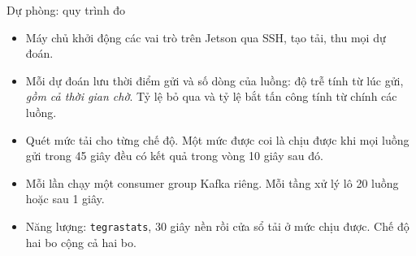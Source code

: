 \documentclass[aspectratio=169, 11pt]{beamer}
\begin{document}
\begin{frame}{Dự phòng: quy trình đo}
  \begin{itemize}\small
    \item Máy chủ khởi động các vai trò trên Jetson qua SSH, tạo tải, thu mọi
          dự đoán.
    \item Mỗi dự đoán lưu thời điểm gửi và số dòng của luồng: độ trễ tính từ
          lúc gửi, \emph{gồm cả thời gian chờ}. Tỷ lệ bỏ qua và tỷ lệ bắt tấn
          công tính từ chính các luồng.
    \item Quét mức tải cho từng chế độ. Một mức được coi là chịu được khi mọi
          luồng gửi trong 45 giây đều có kết quả trong vòng 10 giây sau đó.
    \item Mỗi lần chạy một consumer group Kafka riêng. Mỗi tầng xử lý lô 20
          luồng hoặc sau 1 giây.
    \item Năng lượng: \texttt{tegrastats}, 30 giây nền rồi cửa sổ tải ở mức
          chịu được. Chế độ hai bo cộng cả hai bo.
  \end{itemize}
\end{frame}
\end{document}
